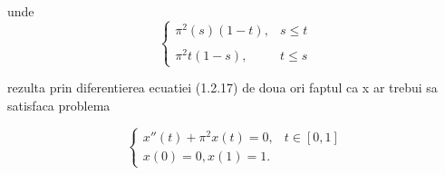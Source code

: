 \documentclass[a4paper,12pt,oneside]{report}
\begin{document}
unde
\begin{displaymath}
  \left\{\begin{matrix}
\pi ^{2} \left ( s \right )\left ( 1-t \right ) , & s\leq t\\ 
 & \\ \pi ^{2}t\left ( 1-s \right ),  & t\leq s
\end{matrix}\right.
\end{displaymath}

rezulta prin diferentierea ecuatiei  (1.2.17) de doua ori faptul ca x ar trebui sa satisfaca problema 

\begin{displaymath}
  \left\{\begin{matrix}
{x}'' \left ( t \right ) + \pi ^{2}x\left ( t \right )  = 0, & t \in \left [ 0,1 \right ] \\ 
x\left ( 0 \right )  =  0, x \left ( 1 \right ) = 1.& 
\end{matrix}\right.
\end{displaymath}





\setlength{\baselineskip}{\normalbaselineskip}
\setlength{\parskip}{0pt}

\end{document}

